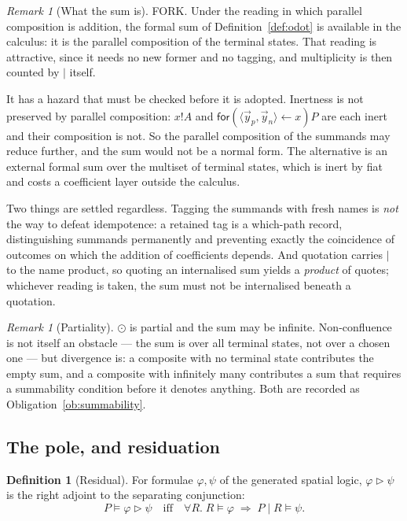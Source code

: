 \documentclass[11pt]{article}
\theoremstyle{definition}
\newtheorem{definition}[theorem]{Definition}
\theoremstyle{remark}
\newtheorem{remark}[theorem]{Remark}
\newcommand{\dip}[2]{\ensuremath{\langle #1 , #2 \rangle}}
\begin{document}
\begin{remark}[What the sum is]
\label{rem:sumfork}
FORK. Under the reading in which parallel composition is addition, the formal
sum of Definition~\ref{def:odot} is available in the calculus: it is the
parallel composition of the terminal states. That reading is attractive, since
it needs no new former and no tagging, and multiplicity is then counted by
$\mid$ itself.

It has a hazard that must be checked before it is adopted. Inertness is not
preserved by parallel composition: $x!A$ and
$\mathsf{for}(\dip{\vec{y}_p}{\vec{y}_n} \leftarrow x)P$ are each inert and their
composition is not. So the parallel composition of the summands may reduce
further, and the sum would not be a normal form. The alternative is an external
formal sum over the multiset of terminal states, which is inert by fiat and
costs a coefficient layer outside the calculus.

Two things are settled regardless. Tagging the summands with fresh names is
\emph{not} the way to defeat idempotence: a retained tag is a which-path record,
distinguishing summands permanently and preventing exactly the coincidence of
outcomes on which the addition of coefficients depends. And quotation carries
$\mid$ to the name product, so quoting an internalised sum yields a
\emph{product} of quotes; whichever reading is taken, the sum must not be
internalised beneath a quotation.
\end{remark}

\begin{remark}[Partiality]
\label{rem:partiality}
$\odot$ is partial and the sum may be infinite. Non-confluence is not itself an
obstacle --- the sum is over all terminal states, not over a chosen one --- but
divergence is: a composite with no terminal state contributes the empty sum, and
a composite with infinitely many contributes a sum that requires a summability
condition before it denotes anything. Both are recorded as
Obligation~\ref{ob:summability}.
\end{remark}

\subsection{The pole, and residuation}
\label{sec:pole}

\begin{definition}[Residual]
\label{def:residual}
For formulae $\varphi, \psi$ of the generated spatial logic, $\varphi \rhd \psi$
is the right adjoint to the separating conjunction:
\[
  P \models \varphi \rhd \psi
  \quad\text{iff}\quad
  \forall R.\; R \models \varphi \;\Rightarrow\; P \mid R \models \psi .
\]
\end{definition}
\end{document}
